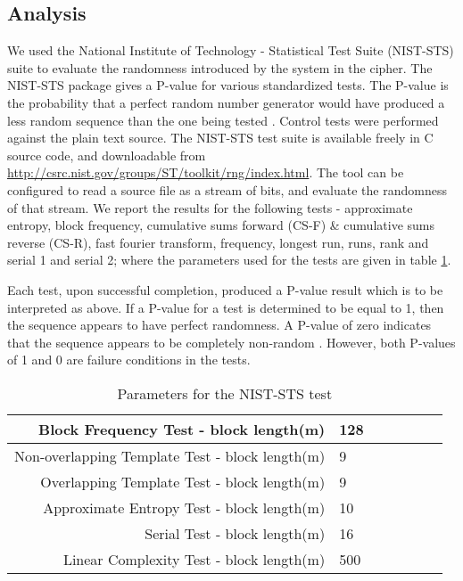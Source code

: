\documentclass[conference]{IEEEtran}
\begin{document}
\subsection{Analysis}
We used the National Institute of Technology - Statistical Test Suite (NIST-STS) suite to evaluate the randomness introduced by the system in the cipher. The NIST-STS package gives a P-value for various standardized tests. The P-value is the probability that a perfect random number generator would have produced a less random sequence than the one being tested \cite{Rukhin}. Control tests were performed against the plain text source. The NIST-STS test suite is available freely in C source code, and downloadable from \url{http://csrc.nist.gov/groups/ST/toolkit/rng/index.html}. The tool can be configured to read a source file as a stream of bits, and evaluate the randomness of that stream. We report the results for the following tests - approximate entropy, block frequency, cumulative sums forward (CS-F) \& cumulative sums reverse (CS-R), fast fourier transform, frequency, longest run, runs, rank and serial 1 and serial 2; where the parameters used for the tests are given in table \ref{NIST-STS_parameters}.

Each test, upon successful completion, produced a P-value result which is to be interpreted as above. If a P-value for a test is determined to be equal to 1, then the sequence appears to have perfect randomness. A P-value of zero indicates that the sequence appears to be completely non-random \cite{Rukhin}. However, both P-values of 1 and 0 are failure conditions in the tests.

\begin{table}\label{NIST-STS_parameters}
\centering
\begin{tabular}{|r|l|l|l|l|l|l|}
\hline
Block Frequency Test - block length(m)& 128\\ \hline
Non-overlapping Template Test - block length(m)& 9\\ \hline
Overlapping Template Test - block length(m)& 9\\ \hline
Approximate Entropy Test - block length(m)& 10\\ \hline
Serial Test - block length(m)& 16\\ \hline
Linear Complexity Test - block length(m)& 500\\ \hline
\end{tabular}
\caption{Parameters for the NIST-STS test}
\vspace{-0.28in}
\end{table}
\end{document}
